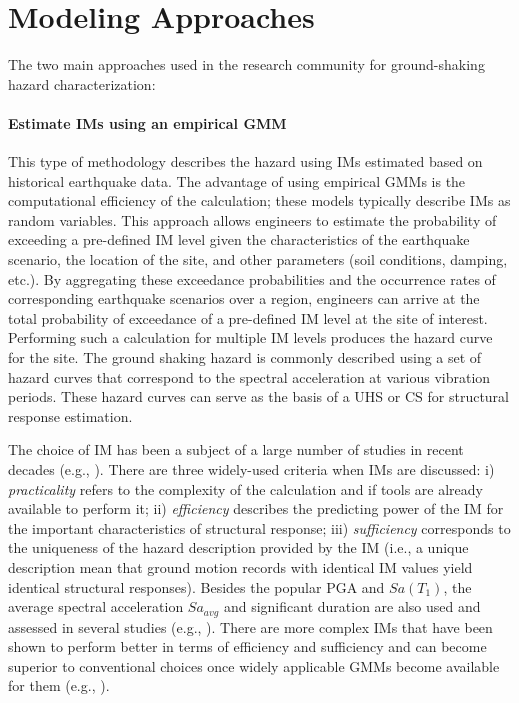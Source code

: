 \section{Modeling Approaches}
\label{sec:eq_shake_models}

The two main approaches used in the research community for ground-shaking hazard characterization:

\paragraph{Estimate IMs using an empirical GMM} This type of methodology describes the hazard using IMs estimated based on historical earthquake data. The advantage of using empirical GMMs is the computational efficiency of the calculation; these models typically describe IMs as random variables. This approach allows engineers to estimate the probability of exceeding a pre-defined IM level given the characteristics of the earthquake scenario, the location of the site, and other parameters (soil conditions, damping, etc.). By aggregating these exceedance probabilities and the occurrence rates of corresponding earthquake scenarios over a region, engineers can arrive at the total probability of exceedance of a pre-defined IM level at the site of interest. Performing such a calculation for multiple IM levels produces the hazard curve for the site. The ground shaking hazard is commonly described using a set of hazard curves that correspond to the spectral acceleration at various vibration periods. These hazard curves can serve as the basis of a UHS or CS for structural response estimation.

The choice of IM has been a subject of a large number of studies in recent decades (e.g., \cite{shome1998earthquakes, luco2007structure}). There are three widely-used criteria when IMs are discussed: i) \emph{practicality} refers to the complexity of the calculation and if tools are already available to perform it; ii) \emph{efficiency} describes the predicting power of the IM for the important characteristics of structural response; iii) \emph{sufficiency} corresponds to the uniqueness of the hazard description provided by the IM (i.e., a unique description mean that ground motion records with identical IM values yield identical structural responses). Besides the popular PGA and $Sa(T_1)$, the average spectral acceleration $Sa_{avg}$ and significant duration are also used and assessed in several studies (e.g., \cite{bijelic2018validation}). There are more complex IMs that have been shown to perform better in terms of efficiency and sufficiency and can become superior to conventional choices once widely applicable GMMs become available for them (e.g., \cite{davalos2019filtered}). 

